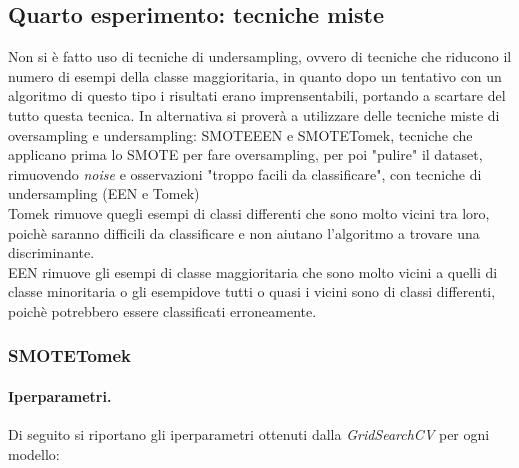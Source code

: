 \subsection{Quarto esperimento: tecniche miste}
\noindent Non si è fatto uso di tecniche di undersampling, ovvero di tecniche che riducono il numero di esempi della classe maggioritaria, in quanto dopo un tentativo con un algoritmo di questo tipo i risultati erano imprensentabili, portando a scartare del tutto questa tecnica. In alternativa si proverà a utilizzare delle tecniche miste di oversampling e undersampling: SMOTEEEN e SMOTETomek, tecniche che applicano prima lo SMOTE per fare oversampling, per poi "pulire" il dataset, rimuovendo \textit{noise} e osservazioni "troppo facili da classificare", con tecniche di undersampling (EEN e Tomek)\\ Tomek rimuove quegli esempi di classi differenti che sono molto vicini tra loro, poichè saranno difficili da classificare e non aiutano l'algoritmo a trovare una discriminante. \\ EEN rimuove gli esempi di classe maggioritaria che sono molto vicini a quelli di classe minoritaria o gli esempidove tutti o quasi i vicini sono di classi differenti, poichè potrebbero essere classificati erroneamente.

\subsubsection{SMOTETomek}
\paragraph{Iperparametri.} Di seguito si riportano gli iperparametri ottenuti dalla \textit{GridSearchCV} per ogni modello:

